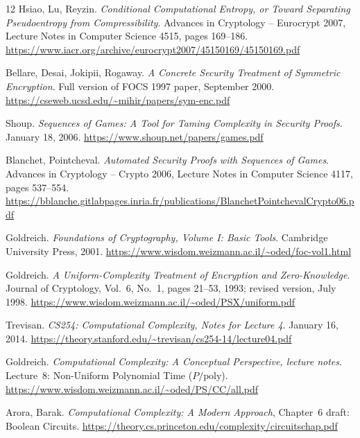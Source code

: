 \documentclass[11pt]{article}
\begin{document}
\begin{thebibliography}{12}
Hsiao, Lu, Reyzin.
\emph{Conditional Computational Entropy, or Toward Separating Pseudoentropy from Compressibility}.
Advances in Cryptology -- Eurocrypt 2007, Lecture Notes in Computer Science 4515, pages 169--186.
\url{https://www.iacr.org/archive/eurocrypt2007/45150169/45150169.pdf}

Bellare, Desai, Jokipii, Rogaway.
\emph{A Concrete Security Treatment of Symmetric Encryption}.
Full version of FOCS 1997 paper, September 2000.
\url{https://cseweb.ucsd.edu/~mihir/papers/sym-enc.pdf}

Shoup.
\emph{Sequences of Games: A Tool for Taming Complexity in Security Proofs}.
January 18, 2006.
\url{https://www.shoup.net/papers/games.pdf}

Blanchet, Pointcheval.
\emph{Automated Security Proofs with Sequences of Games}.
Advances in Cryptology -- Crypto 2006, Lecture Notes in Computer Science 4117, pages 537--554.
\url{https://bblanche.gitlabpages.inria.fr/publications/BlanchetPointchevalCrypto06.pdf}

Goldreich.
\emph{Foundations of Cryptography, Volume I: Basic Tools}.
Cambridge University Press, 2001.
\url{https://www.wisdom.weizmann.ac.il/~oded/foc-vol1.html}

Goldreich.
\emph{A Uniform-Complexity Treatment of Encryption and Zero-Knowledge}.
Journal of Cryptology, Vol.~6, No.~1, pages 21--53, 1993; revised version, July 1998.
\url{https://www.wisdom.weizmann.ac.il/~oded/PSX/uniform.pdf}

Trevisan.
\emph{CS254: Computational Complexity, Notes for Lecture 4}.
January 16, 2014.
\url{https://theory.stanford.edu/~trevisan/cs254-14/lecture04.pdf}

Goldreich.
\emph{Computational Complexity: A Conceptual Perspective, lecture notes}.
Lecture~8: Non-Uniform Polynomial Time ($P/\mathrm{poly}$).
\url{https://www.wisdom.weizmann.ac.il/~oded/PS/CC/all.pdf}

Arora, Barak.
\emph{Computational Complexity: A Modern Approach}, Chapter~6 draft: Boolean Circuits.
\url{https://theory.cs.princeton.edu/complexity/circuitschap.pdf}

\end{thebibliography}
\end{document}
